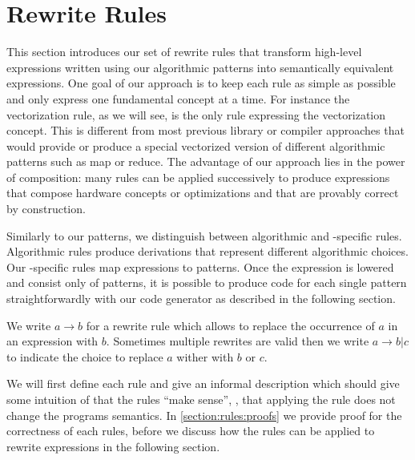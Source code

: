\section{Rewrite Rules}
\label{section:rules}

This section introduces our set of rewrite rules that transform high-level expressions written using our algorithmic patterns into semantically equivalent expressions.
One goal of our approach is to keep each rule as simple as possible and only express one fundamental concept at a time.
For instance the vectorization rule, as we will see, is the only rule expressing the vectorization concept.
This is different from most previous library or compiler approaches that would provide or produce a special vectorized version of different algorithmic patterns such as map or reduce.
The advantage of our approach lies in the power of composition:
many rules can be applied successively to produce expressions that compose hardware concepts or optimizations and that are provably correct by construction.

Similarly to our patterns, we distinguish between algorithmic and \OpenCL-specific rules.
Algorithmic rules produce derivations that represent different algorithmic choices.
Our \OpenCL-specific rules map expressions to \OpenCL patterns.
Once the expression is lowered and consist only of \OpenCL patterns, it is possible to produce \OpenCL code for each single pattern straightforwardly with our code generator as described in the following section.

We write $a \rightarrow b$ for a rewrite rule which allows to replace the occurrence of $a$ in an expression with $b$.
Sometimes multiple rewrites are valid then we write $a \rightarrow b | c$ to indicate the choice to replace $a$ wither with $b$ or $c$.

We will first define each rule and give an informal description which should give some intuition of that the rules ``make sense'', \ie, that applying the rule does not change the programs semantics.
In \autoref{section:rules:proofs} we provide proof for the correctness of each rules, before we discuss how the rules can be applied to rewrite expressions in the following section.


